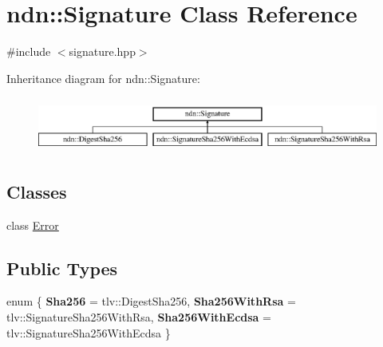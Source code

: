 \hypertarget{classndn_1_1Signature}{}\section{ndn\+:\+:Signature Class Reference}
\label{classndn_1_1Signature}


{\ttfamily \#include $<$signature.\+hpp$>$}

Inheritance diagram for ndn\+:\+:Signature\+:\begin{figure}[H]
\begin{center}
\leavevmode
\includegraphics[height=1.839080cm]{classndn_1_1Signature}
\end{center}
\end{figure}
\subsection*{Classes}
\begin{DoxyCompactItemize}
\item 
class \hyperlink{classndn_1_1Signature_1_1Error}{Error}
\end{DoxyCompactItemize}
\subsection*{Public Types}
\begin{DoxyCompactItemize}
\item 
enum \{ {\bfseries Sha256} = tlv\+:\+:Digest\+Sha256, 
{\bfseries Sha256\+With\+Rsa} = tlv\+:\+:Signature\+Sha256\+With\+Rsa, 
{\bfseries Sha256\+With\+Ecdsa} = tlv\+:\+:Signature\+Sha256\+With\+Ecdsa
 \}
\end{DoxyCompactItemize}
